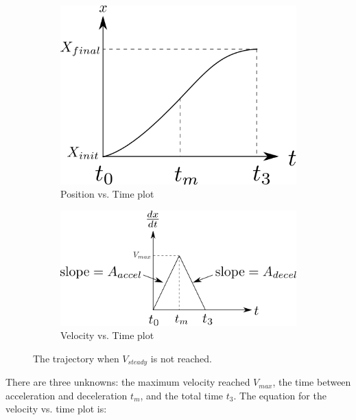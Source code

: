 \documentclass[11pt]{article} %
\begin{document}
\begin{figure}[tbh]
    \centering
    \begin{subfigure}[b]{0.35\textwidth}
        \centering
        \includegraphics[width=\textwidth]{case2_position_vs_time.png}
        \caption{Position vs. Time plot}
        \label{fig:case2_position_vs_time}
    \end{subfigure}
    \hfill
    \begin{subfigure}[b]{0.525\textwidth}
        \centering
        \includegraphics[width=\textwidth]{case2_velocity_vs_time.png}
        \caption{Velocity vs. Time plot}
        \label{fig:case2_velocity_vs_time}
    \end{subfigure}
    \caption{The trajectory when $V_{steady}$ is not reached.}
    \label{fig:case2_trajectories}
\end{figure}

\noindent There are three unknowns: the maximum velocity reached $V_{max}$, the time between acceleration and deceleration $t_m$, and the total time $t_3$. The equation for the velocity vs. time plot is:
\end{document}
